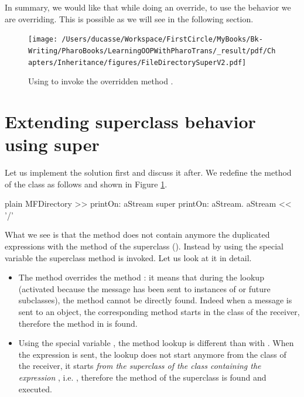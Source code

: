 \documentclass[10pt,twoside,english]{_support/latex/sbabook/sbabook}
\begin{document}
In summary, we would like that while doing an override, to use the behavior we are overriding. This is possible as we will see in the following section. 


\begin{figure}

\begin{center}
\texttt{[image: /Users/ducasse/Workspace/FirstCircle/MyBooks/Bk-Writing/PharoBooks/LearningOOPWithPharoTrans/\_result/pdf/Chapters/Inheritance/figures/FileDirectorySuperV2.pdf]}\caption{Using  to invoke the overridden method .\label{fig:FileDirectorySuperV2}}\end{center}
\end{figure}

\section{Extending superclass behavior using super}
Let us implement the solution first and discuss it after. We redefine the method  of the class  as follows and shown in Figure \ref{fig:FileDirectorySuperV2}.

\begin{displaycode}{plain}
MFDirectory >> printOn: aStream
	super printOn: aStream.
	aStream << '/'
\end{displaycode}

What we see is that the method  does not contain anymore the duplicated expressions with the method  of the superclass (). Instead by using the special variable  the superclass method is invoked. Let us look at it in detail.

\begin{itemize}
\item The method  overrides the method : it means that during the lookup (activated because the message  has been sent to instances of  or future subclasses), the method  cannot be directly found. Indeed when a message is sent to an object, the corresponding method starts in the class of the receiver, therefore the method in  is found.
\end{itemize}

\begin{itemize}
\item Using the special variable , the method lookup is different than with . When the expression  is sent, the lookup does not start anymore from the class of the receiver, it starts \textit{from the superclass of the class containing the expression} , i.e. , therefore the method of the superclass is found and executed. 
\end{itemize}
\end{document}
